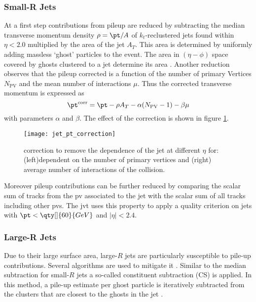 \subsubsection{Small-R Jets}
At a first step contributions from pileup are reduced by subtracting the median transverse momentum density $\rho=\pt / A$ of $k_t$-reclustered jets found within $\eta<2.0$ multiplied by the area of the jet $A_T$. This area is determined by uniformly adding massless `ghost' particles to the event. The area in $(\eta-\phi)$ space covered by ghosts clustered to a jet determine its area \citep{ATLAS-CONF-2017-065}. Another reduction observes that the pileup corrected \pt is a function of the number of primary Vertices $N_\text{PV}$ and the mean number of interactions $\mu$. Thus the corrected transverse momentum is expressed as
\begin{equation}
  \pt^\text{corr}=\pt-\rho A_T -\alpha(N_\text{PV}-1)-\beta\mu
\end{equation}
with parameters $\alpha$ and $\beta$. The effect of the correction is shown in figure \ref{fig:jet_pt_correction}.
\begin{figure}
  \centering
  \texttt{[image: jet\_pt\_correction]}
  \caption[]{\pt correction to remove the \pt dependence of the jet at different $\eta$ for: (left)\pt dependent on the number of primary vertices and (right) average number of interactions of the collision.}
  \label{fig:jet_pt_correction}
\end{figure}

Moreover pileup contributions can be further reduced by comparing the scalar \pt sum of tracks from the \ac{pv} associated to the jet with the scalar \pt sum of all tracks including other \acp{pv}. The \ac{jvt} \citep{ATLAS-CONF-2014-018} uses this property to apply a quality criterion on jets with $\pt<\qty[]{60}{GeV}$ and $|\eta|<2.4$.


\subsubsection{Large-R Jets}
Due to their large surface area, large-$R$ jets are particularly susceptible to pile-up contributions. Several algorithms are used to mitigate it \citep{atlas2021optimisation}. Similar to the median \pt subtraction for small-$R$ jets a so-called constituent subtraction (CS) is applied. In this method, a pile-up estimate per ghost particle is iteratively subtracted from the clusters that are closest to the ghosts in the jet \citep{ATLAS-CONF-2017-065}. 

